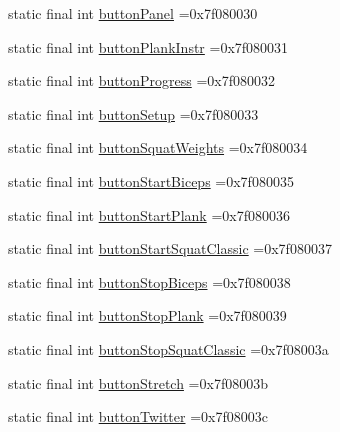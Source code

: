 \begin{DoxyCompactItemize}
static final int \mbox{\hyperlink{classcom_1_1example_1_1trainawearapplication_1_1_r_1_1id_a5f007760c048e8be4b3d70247b0b0433}{button\+Panel}} =0x7f080030
\item 
static final int \mbox{\hyperlink{classcom_1_1example_1_1trainawearapplication_1_1_r_1_1id_a46a058cc666090f91ed84172910c915d}{button\+Plank\+Instr}} =0x7f080031
\item 
static final int \mbox{\hyperlink{classcom_1_1example_1_1trainawearapplication_1_1_r_1_1id_a23991baf6acb53a881cd0058909b54c1}{button\+Progress}} =0x7f080032
\item 
static final int \mbox{\hyperlink{classcom_1_1example_1_1trainawearapplication_1_1_r_1_1id_a066b3f465996ba7c3c2600c9ceced035}{button\+Setup}} =0x7f080033
\item 
static final int \mbox{\hyperlink{classcom_1_1example_1_1trainawearapplication_1_1_r_1_1id_a020e932a7a1a725dc0a5a5a2b5490c9d}{button\+Squat\+Weights}} =0x7f080034
\item 
static final int \mbox{\hyperlink{classcom_1_1example_1_1trainawearapplication_1_1_r_1_1id_a2d3063b49a856ced0c68d5caa3ed70bf}{button\+Start\+Biceps}} =0x7f080035
\item 
static final int \mbox{\hyperlink{classcom_1_1example_1_1trainawearapplication_1_1_r_1_1id_a206fd9cf84aad86924005a12c7dd90d7}{button\+Start\+Plank}} =0x7f080036
\item 
static final int \mbox{\hyperlink{classcom_1_1example_1_1trainawearapplication_1_1_r_1_1id_a2188491e7e153f7fb3dbf4de4b60942f}{button\+Start\+Squat\+Classic}} =0x7f080037
\item 
static final int \mbox{\hyperlink{classcom_1_1example_1_1trainawearapplication_1_1_r_1_1id_a03dff954dc448697ba07074b01d9997a}{button\+Stop\+Biceps}} =0x7f080038
\item 
static final int \mbox{\hyperlink{classcom_1_1example_1_1trainawearapplication_1_1_r_1_1id_af3e257d6cc2a93bf4fdd9bceb86da818}{button\+Stop\+Plank}} =0x7f080039
\item 
static final int \mbox{\hyperlink{classcom_1_1example_1_1trainawearapplication_1_1_r_1_1id_a6118ced90640f275b1182a3ba9d6301b}{button\+Stop\+Squat\+Classic}} =0x7f08003a
\item 
static final int \mbox{\hyperlink{classcom_1_1example_1_1trainawearapplication_1_1_r_1_1id_ab4a58234dde61ddb48cd3f2f90d34775}{button\+Stretch}} =0x7f08003b
\item 
static final int \mbox{\hyperlink{classcom_1_1example_1_1trainawearapplication_1_1_r_1_1id_a4575a50167e8e79b0390c94bf121ee35}{button\+Twitter}} =0x7f08003c

\end{DoxyCompactItemize}
